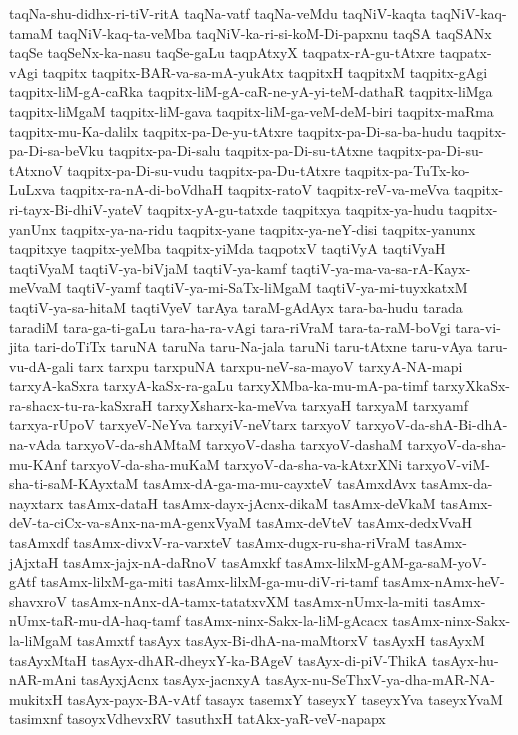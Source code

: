 {taqNa-shu-didhx-ri-tiV-ritA
taqNa-vatf
taqNa-veMdu
taqNiV-kaqta
taqNiV-kaq-tamaM
taqNiV-kaq-ta-veMba
taqNiV-ka-ri-si-koM-Di-papxnu
taqSA
taqSANx
taqSe
taqSeNx-ka-nasu
taqSe-gaLu
taqpAtxyX
taqpatx-rA-gu-tAtxre
taqpatx-vAgi
taqpitx
taqpitx-BAR-va-sa-mA-yukAtx
taqpitxH
taqpitxM
taqpitx-gAgi
taqpitx-liM-gA-caRka
taqpitx-liM-gA-caR-ne-yA-yi-teM-dathaR
taqpitx-liMga
taqpitx-liMgaM
taqpitx-liM-gava
taqpitx-liM-ga-veM-deM-biri
taqpitx-maRma
taqpitx-mu-Ka-dalilx
taqpitx-pa-De-yu-tAtxre
taqpitx-pa-Di-sa-ba-hudu
taqpitx-pa-Di-sa-beVku
taqpitx-pa-Di-salu
taqpitx-pa-Di-su-tAtxne
taqpitx-pa-Di-su-tAtxnoV
taqpitx-pa-Di-su-vudu
taqpitx-pa-Du-tAtxre
taqpitx-pa-TuTx-ko-LuLxva
taqpitx-ra-nA-di-boVdhaH
taqpitx-ratoV
taqpitx-reV-va-meVva
taqpitx-ri-tayx-Bi-dhiV-yateV
taqpitx-yA-gu-tatxde
taqpitxya
taqpitx-ya-hudu
taqpitx-yanUnx
taqpitx-ya-na-ridu
taqpitx-yane
taqpitx-ya-neY-disi
taqpitx-yanunx
taqpitxye
taqpitx-yeMba
taqpitx-yiMda
taqpotxV
taqtiVyA
taqtiVyaH
taqtiVyaM
taqtiV-ya-biVjaM
taqtiV-ya-kamf
taqtiV-ya-ma-va-sa-rA-Kayx-meVvaM
taqtiV-yamf
taqtiV-ya-mi-SaTx-liMgaM
taqtiV-ya-mi-tuyxkatxM
taqtiV-ya-sa-hitaM
taqtiVyeV
tarAya
taraM-gAdAyx
tara-ba-hudu
tarada
taradiM
tara-ga-ti-gaLu
tara-ha-ra-vAgi
tara-riVraM
tara-ta-raM-boVgi
tara-vi-jita
tari-doTiTx
taruNA
taruNa
taru-Na-jala
taruNi
taru-tAtxne
taru-vAya
taru-vu-dA-gali
tarx
tarxpu
tarxpuNA
tarxpu-neV-sa-mayoV
tarxyA-NA-mapi
tarxyA-kaSxra
tarxyA-kaSx-ra-gaLu
tarxyXMba-ka-mu-mA-pa-timf
tarxyXkaSx-ra-shacx-tu-ra-kaSxraH
tarxyXsharx-ka-meVva
tarxyaH
tarxyaM
tarxyamf
tarxya-rUpoV
tarxyeV-NeYva
tarxyiV-neVtarx
tarxyoV
tarxyoV-da-shA-Bi-dhA-na-vAda
tarxyoV-da-shAMtaM
tarxyoV-dasha
tarxyoV-dashaM
tarxyoV-da-sha-mu-KAnf
tarxyoV-da-sha-muKaM
tarxyoV-da-sha-va-kAtxrXNi
tarxyoV-viM-sha-ti-saM-KAyxtaM
tasAmx-dA-ga-ma-mu-cayxteV
tasAmxdAvx
tasAmx-da-nayxtarx
tasAmx-dataH
tasAmx-dayx-jAcnx-dikaM
tasAmx-deVkaM
tasAmx-deV-ta-ciCx-va-sAnx-na-mA-genxVyaM
tasAmx-deVteV
tasAmx-dedxVvaH
tasAmxdf
tasAmx-divxV-ra-varxteV
tasAmx-dugx-ru-sha-riVraM
tasAmx-jAjxtaH
tasAmx-jajx-nA-daRnoV
tasAmxkf
tasAmx-lilxM-gAM-ga-saM-yoV-gAtf
tasAmx-lilxM-ga-miti
tasAmx-lilxM-ga-mu-diV-ri-tamf
tasAmx-nAmx-heV-shavxroV
tasAmx-nAnx-dA-tamx-tatatxvXM
tasAmx-nUmx-la-miti
tasAmx-nUmx-taR-mu-dA-haq-tamf
tasAmx-ninx-Sakx-la-liM-gAcacx
tasAmx-ninx-Sakx-la-liMgaM
tasAmxtf
tasAyx
tasAyx-Bi-dhA-na-maMtorxV
tasAyxH
tasAyxM
tasAyxMtaH
tasAyx-dhAR-dheyxY-ka-BAgeV
tasAyx-di-piV-ThikA
tasAyx-hu-nAR-mAni
tasAyxjAcnx
tasAyx-jacnxyA
tasAyx-nu-SeThxV-ya-dha-mAR-NA-mukitxH
tasAyx-payx-BA-vAtf
tasayx
tasemxY
taseyxY
taseyxYva
taseyxYvaM
tasimxnf
tasoyxVdhevxRV
tasuthxH
tatAkx-yaR-veV-napapx
}
